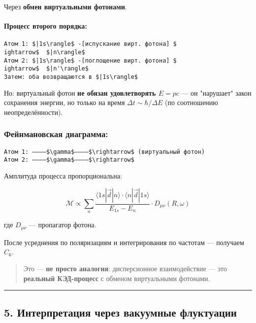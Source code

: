 \documentclass[11pt]{article}
\begin{document}
Через \textbf{обмен виртуальными фотонами}.

\paragraph{Процесс второго
порядка:}\label{ux43fux440ux43eux446ux435ux441ux441-ux432ux442ux43eux440ux43eux433ux43e-ux43fux43eux440ux44fux434ux43aux430}

\begin{verbatim}
Атом 1: $|1s\rangle$ -[испускание вирт. фотона] $
ightarrow$  $|n\rangle$  
Атом 2: $|1s\rangle$ -[поглощение вирт. фотона] $
ightarrow$  $|n'\rangle$  
Затем: оба возвращаются в $|1s\rangle$
\end{verbatim}

Но: виртуальный фотон \textbf{не обязан удовлетворять \(E = pc\)} --- он
"нарушает" закон сохранения энергии, но только на время
\(\Delta t \sim \hbar / \Delta E\) (по соотношению неопределённости).

\subsubsection{Фейнмановская
диаграмма:}\label{ux444ux435ux439ux43dux43cux430ux43dux43eux432ux441ux43aux430ux44f-ux434ux438ux430ux433ux440ux430ux43cux43cux430}

\begin{verbatim}
Атом 1: ————$\gamma$————$\rightarrow$ (виртуальный фотон)
Атом 2: ————$\gamma$————$\rightarrow$
\end{verbatim}

Амплитуда процесса пропорциональна:

\[
\mathcal{M} \propto \sum_n \frac{ \langle 1s| \vec{d} |n \rangle \cdot \langle n| \vec{d} |1s \rangle }{ E_{1s} - E_n } \cdot D_{\mu\nu}(R, \omega)
\]

где \(D_{\mu\nu}\) --- пропагатор фотона.

После усреднения по поляризациям и интегрирования по частотам ---
получаем \(C_6\).

\begin{quote}
Это --- \textbf{не просто аналогия}: дисперсионное взаимодействие ---
это \textbf{реальный КЭД-процесс} с обменом виртуальными фотонами.
\end{quote}

\begin{center}\rule{0.5\linewidth}{\linethickness}\end{center}

\subsection{5. Интерпретация через вакуумные
флуктуации}\label{ux438ux43dux442ux435ux440ux43fux440ux435ux442ux430ux446ux438ux44f-ux447ux435ux440ux435ux437-ux432ux430ux43aux443ux443ux43cux43dux44bux435-ux444ux43bux443ux43aux442ux443ux430ux446ux438ux438}
\end{document}
